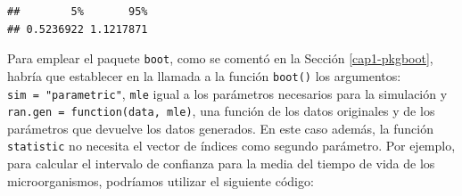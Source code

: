\documentclass[]{book}
\newenvironment{Shaded}{\begin{snugshade}}{\end{snugshade}}
\newcommand{\KeywordTok}[1]{\textcolor[rgb]{0.13,0.29,0.53}{\textbf{#1}}}
\newcommand{\DecValTok}[1]{\textcolor[rgb]{0.00,0.00,0.81}{#1}}
\newcommand{\StringTok}[1]{\textcolor[rgb]{0.31,0.60,0.02}{#1}}
\newcommand{\CommentTok}[1]{\textcolor[rgb]{0.56,0.35,0.01}{\textit{#1}}}
\newcommand{\OperatorTok}[1]{\textcolor[rgb]{0.81,0.36,0.00}{\textbf{#1}}}
\newcommand{\NormalTok}[1]{#1}
\theoremstyle{definition}
\theoremstyle{definition}
\theoremstyle{definition}
\theoremstyle{remark}
\begin{document}
\begin{Shaded}
\end{Shaded}

\begin{verbatim}
##        5%       95% 
## 0.5236922 1.1217871
\end{verbatim}

Para emplear el paquete \texttt{boot}, como se comentó en la Sección
\ref{cap1-pkgboot}, habría que establecer en la llamada a la función
\texttt{boot()} los argumentos: \texttt{sim\ =\ "parametric"},
\texttt{mle} igual a los parámetros necesarios para la simulación y
\texttt{ran.gen\ =\ function(data,\ mle)}, una función de los datos
originales y de los parámetros que devuelve los datos generados. En este
caso además, la función \texttt{statistic} no necesita el vector de
índices como segundo parámetro. Por ejemplo, para calcular el intervalo
de confianza para la media del tiempo de vida de los microorganismos,
podríamos utilizar el siguiente código:
\end{document}
